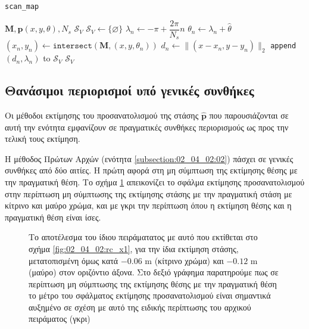 \begin{algorithm}[!h]
  \caption{\texttt{scan\_map}}
  \begin{spacing}{1.3}
    \begin{algorithmic}[1]
      \REQUIRE $\bm{M}, \bm{p}(x, y, \theta), N_s$
      \ENSURE $\mathcal{S}_V$
      \STATE $\mathcal{S}_V \leftarrow \{\varnothing\}$
      \STATE $\lambda_n \leftarrow -\pi + \dfrac{2\pi}{N_s} n$
      \STATE $\theta_n \leftarrow \lambda_n + \hat{\theta}$
      \STATE $(x_n,y_n) \leftarrow \texttt{intersect}(\bm{M}, (x,y, \theta_n))$
      \STATE $d_n \leftarrow \|(x- x_n, y-y_n)\|_2$
      \STATE \texttt{append} $(d_n, \lambda_n)$ to $\mathcal{S}_V$
      \ENDFOR
      \RETURN $\mathcal{S}_V$
    \end{algorithmic}
  \end{spacing}
  \label{alg:scan_map}
\end{algorithm}


\subsection{Θανάσιμοι περιορισμοί υπό γενικές συνθήκες}
\label{subsection:02_04_02:07}

Οι μέθοδοι εκτίμησης του προσανατολισμού της στάσης $\hat{\bm{p}}$ που
παρουσιάζονται σε αυτή την ενότητα εμφανίζουν σε πραγματικές συνθήκες
περιορισμούς ως προς την τελική τους εκτίμηση.

Η μέθοδος Πρώτων Αρχών (ενότητα \ref{subsection:02_04_02:02}) πάσχει σε
γενικές συνθήκες από δύο αιτίες. Η πρώτη αφορά στη μη σύμπτωση της εκτίμησης
θέσης με την πραγματική θέση. Το σχήμα \ref{fig:02_04_02:skg_non_convergence}
απεικονίζει το σφάλμα εκτίμησης προσανατολισμού στην περίπτωση μη σύμπτωσης της
εκτίμησης στάσης με την πραγματική στάση με κίτρινο και μαύρο χρώμα, και με
γκρι την περίπτωση όπου η εκτίμηση θέσης και η πραγματική θέση είναι ίσες.

\begin{figure}[!h]\centering
  \vspace{2cm}
  
  \vspace{1cm}
  \caption{\small Το αποτέλεσμα του ίδιου πειράματατος με αυτό που εκτίθεται
           στο σχήμα \ref{fig:02_04_02:rc_x1}, για την ίδια εκτίμηση στάσης,
           μετατοπισμένη όμως κατά $-0.06$ m (κίτρινο χρώμα) και $-0.12$ m
           (μαύρο) στον οριζόντιο άξονα. Στο δεξιό γράφημα παρατηρούμε πως σε
           περίπτωση μη σύμπτωσης της εκτίμησης θέσης με την πραγματική θέση
           το μέτρο του σφάλματος εκτίμησης προσανατολισμού
           είναι σημαντικά αυξημένο σε σχέση με αυτό της ειδικής περίπτωσης του
           αρχικού πειράματος (γκρι)}
  \label{fig:02_04_02:skg_non_convergence}
\end{figure}

